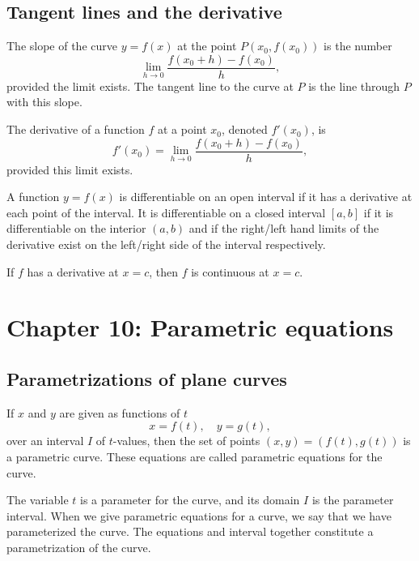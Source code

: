 \documentclass{article}
\begin{document}
\subsection{Tangent lines and the derivative}
\begin{definition}
	The slope of the curve \(y=f(x)\) at the point \(P(x_0,f(x_0))\) is the number
	\begin{equation*}
		\lim_{h\rightarrow 0}\frac{f(x_0+h)-f(x_0)}{h},
	\end{equation*}
	provided the limit exists. The tangent line to the curve at \(P\) is the line through \(P\) with this slope.
\end{definition}
\begin{definition}[Derivative]
	The derivative of a function \(f\) at a point \(x_0\), denoted \(f'(x_0)\), is
	\begin{equation*}
		f'(x_0)=\lim_{h\rightarrow 0}\frac{f(x_0+h)-f(x_0)}{h},
	\end{equation*}
	provided this limit exists.
\end{definition}
\begin{definition}[Differentiability]
	A function \(y=f(x)\) is differentiable on an open interval if it has a derivative at each point of the interval. It is differentiable on a closed interval \([a,b]\) if it is differentiable on the interior \((a,b)\) and if the right/left hand limits of the derivative exist on the left/right side of the interval respectively.
\end{definition}
\begin{theorem}
	If \(f\) has a derivative at \(x=c\), then \(f\) is continuous at \(x=c\).
\end{theorem}
\section{Chapter 10: Parametric equations}
\subsection{Parametrizations of plane curves}
\begin{definition}
	If \(x\) and \(y\) are given as functions of \(t\)
	\begin{equation*}
		x=f(t),\quad y=g(t),
	\end{equation*}
	over an interval \(I\) of \(t\)-values, then the set of points \((x,y)=(f(t),g(t))\) is a parametric curve. These equations are called parametric equations for the curve.
\end{definition}
\begin{remark}
	The variable \(t\) is a parameter for the curve, and its domain \(I\) is the parameter interval. When we give parametric equations for a curve, we say that we have parameterized the curve. The equations and interval together constitute a parametrization of the curve.
\end{remark}
\end{document}
